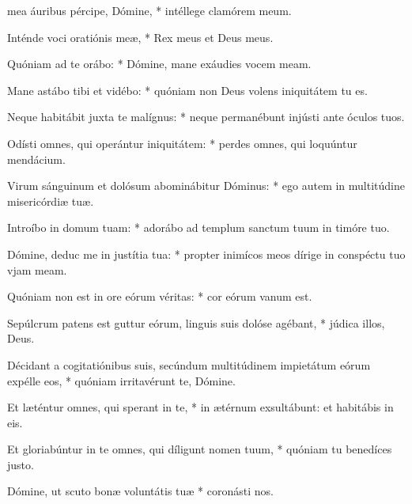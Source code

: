 \begin{psalmus}

 mea áuribus pércipe, Dómine, * intéllege clamórem meum.

Inténde voci oratiónis meæ, * Rex meus et Deus meus.

Quóniam ad te orábo: * Dómine, mane exáudies vocem meam.

Mane astábo tibi et vidébo: * quóniam non Deus volens iniquitátem tu es.

Neque habitábit juxta te malígnus: * neque permanébunt injústi ante óculos tuos.

Odísti omnes, qui operántur iniquitátem: * perdes omnes, qui loquúntur mendácium.

Virum sánguinum et dolósum abominábitur Dóminus: * ego autem in multitúdine misericórdiæ tuæ.

Introíbo in domum tuam: * adorábo ad templum sanctum tuum in timóre tuo.

Dómine, deduc me in justítia tua: * propter inimícos meos dírige in conspéctu tuo vjam meam.

Quóniam non est in ore eórum véritas: * cor eórum vanum est.

Sepúlcrum patens est guttur eórum, linguis suis dolóse agébant, * júdica illos, Deus.

Décidant a cogitatiónibus suis, secúndum multitúdinem impietátum eórum expélle eos, * quóniam irritavérunt te, Dómine.

Et læténtur omnes, qui sperant in te, * in ætérnum exsultábunt: et habitábis in eis.

Et gloriabúntur in te omnes, qui díligunt nomen tuum, * quóniam tu benedíces justo.

Dómine, ut scuto bonæ voluntátis tuæ * coronásti nos.

\end{psalmus}
